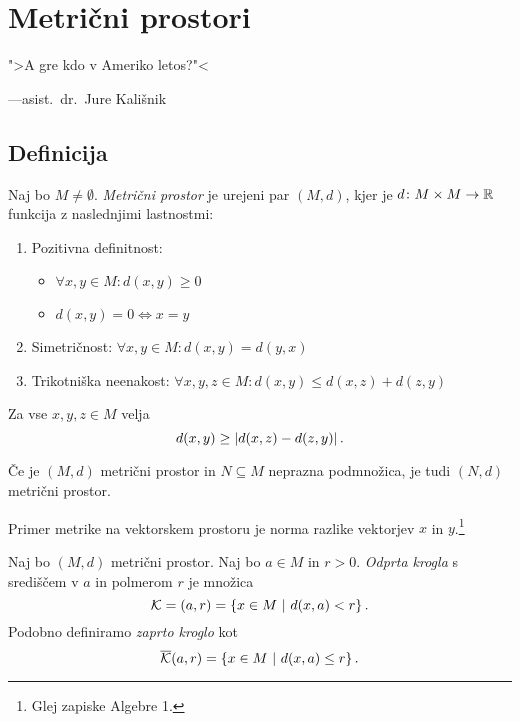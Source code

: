 \documentclass[12pt, a4paper]{article}
\begin{document}
\newpage

\section{Metrični prostori}

\epigraph{">A gre kdo v Ameriko letos?"<}{---asist.~dr.~Jure Kališnik}

\subsection{Definicija}

\begin{okvir}
\begin{definicija}
Naj bo $M\ne\emptyset$. \emph{Metrični prostor} je urejeni par $(M,d)$, kjer je $d\colon M\times M\to\mathbb{R}$ funkcija z naslednjimi lastnostmi:

\begin{enumerate}
\item Pozitivna definitnost:

\begin{itemize}
\item $\forall x,y\in M\colon d(x,y)\geq 0$
\item $d(x,y)=0\iff x=y$
\end{itemize}

\item Simetričnost: $\forall x,y\in M\colon d(x,y)=d(y,x)$
\item Trikotniška neenakost: $\forall x,y,z\in M\colon d(x,y)\leq d(x,z)+d(z,y)$
\end{enumerate}
\end{definicija}
\end{okvir}

\begin{opomba}
Za vse $x,y,z\in M$ velja
\[
d(x,y)\geq\left\lvert d(x,z)-d(z,y)\right\rvert.
\]
\end{opomba}

\begin{opomba}
Če je $(M,d)$ metrični prostor in $N\subseteq M$ neprazna podmnožica, je tudi $(N,d)$ metrični prostor.
\end{opomba}

\begin{opomba}
Primer metrike na vektorskem prostoru je norma razlike vektorjev $x$ in $y$.\footnote{Glej zapiske Algebre 1.}
\end{opomba}

\begin{definicija}
Naj bo $(M,d)$ metrični prostor. Naj bo $a\in M$ in $r>0$. \emph{Odprta krogla} s središčem v $a$ in polmerom $r$ je množica
\[
\mathcal{K}=(a,r)=\left\{x\in M~\middle\vert~d(x,a)<r\right\}.
\]
Podobno definiramo \emph{zaprto kroglo} kot
\[
\overline{\mathcal{K}}(a,r)=\left\{x\in M~\middle\vert~d(x,a)\leq r\right\}.
\]
\end{definicija}
\end{document}
